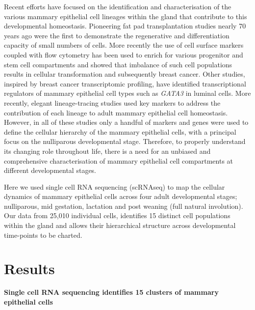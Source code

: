 \documentclass[titlepage, 12pt, oneside]{amsart}
\begin{document}
Recent efforts have focused on the identification and characterisation of the various mammary epithelial cell lineages within the gland that contribute to this developmental homeostasis.
Pioneering fat pad transplantation studies nearly 70 years ago were the first to demonstrate the regenerative and differentiation capacity of small numbers of cells\autocite{Faulkin1960,Daniel197,Smalley1998}.
More recently the use of cell surface markers coupled with flow cytometry has been used to enrich for various progenitor and stem cell compartments\autocite{Smalley1998,Stingl2006,Shackleton2006,Asselin2007} and showed that imbalance of such cell populations results in cellular transformation and subsequently breast cancer\autocite{Lim2009,Molyneux2010}.
Other studies, inspired by breast cancer transcriptomic profiling, have identified transcriptional regulators of mammary epithelial cell types such as \textit{GATA3} in luminal cells\autocite{Asselin2007,Kouros2006}.
More recently, elegant lineage-tracing studies used key markers to address the contribution of each lineage to adult mammary epithelial cell homeostasis\autocite{Inman2015}.
However, in all of these studies only a handful of markers and genes were used to define the cellular hierarchy of the mammary epithelial cells, with a principal focus on the nulliparous developmental stage.
Therefore, to properly understand its changing role throughout life, there is a need for an unbiased and comprehensive characterisation of mammary epithelial cell compartments at different developmental stages.

Here we used single cell RNA sequencing (scRNAseq) to map the cellular dynamics of mammary epithelial cells across four adult developmental stages; nulliparous, mid gestation, lactation and post weaning (full natural involution).
Our data from 25,010 individual cells, identifies 15 distinct cell populations within the gland and allows their hierarchical structure across developmental time-points to be charted.

\section{Results}

\textbf{Single cell RNA sequencing identifies 15 clusters of mammary epithelial cells}
\end{document}
